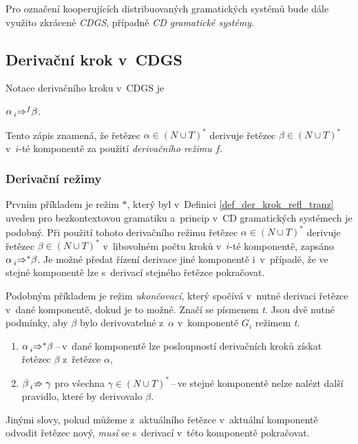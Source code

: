 \begin{convention}
    Pro označení kooperujících distribuovaných gramatických systémů bude dále využito zkrácené \emph{CDGS}, případně \emph{CD gramatické systémy}.
\end{convention}

\subsection*{Derivační krok v~CDGS}
Notace derivačního kroku v~CDGS je
\begin{center}
    $\alpha \prescript{}{i}{\Rightarrow}^{f} \beta$.
\end{center}
Tento zápis znamená, že řetězec $\alpha \in (N \cup T)^{*}$ derivuje řetězec $\beta \in (N \cup T)^{*}$ v~$i$-té komponentě za použití \emph{derivačního režimu} $f$.

\subsubsection*{Derivační režimy}

Prvním příkladem je režim $*$, který byl v~Definici \ref{def_der_krok_refl_tranz} uveden pro bezkontextovou gramatiku a~princip v~CD gramatických systémech je podobný.
Při použití tohoto derivačního režimu řetězec $\alpha \in (N \cup T)^*$ derivuje řetězec $\beta \in (N \cup T)^*$ v~libovolném počtu kroků v~$i$-té komponentě, zapsáno $\alpha \prescript{}{i}{\Rightarrow}^{*} \beta$.
Je možné předat řízení derivace jiné komponentě i~v~případě, že ve stejné komponentě lze s~derivací stejného řetězce pokračovat.

Podobným příkladem je režim \emph{ukončovací}, který spočívá v~nutné derivaci řetězce v~dané komponentě, dokud je to možné. Značí se písmenem \emph{t}. Jsou dvě nutné podmínky, aby $\beta$ bylo derivovatelné z~$\alpha$ v~komponentě $G_i$ režimem \emph{t}.
\begin{enumerate}
    \item $\alpha \prescript{}{i}{\Rightarrow}^{*} \beta$\,--\,v~dané komponentě lze posloupností derivačních kroků získat řetězec $\beta$ z~řetězce $\alpha$,
    \item $\beta \prescript{}{i}{\nRightarrow}\; \gamma$ pro všechna $\gamma \in (N \cup T)^{*}$\,--\,ve stejné komponentě nelze nalézt další pravidlo, které by derivovalo $\beta$.
\end{enumerate}
Jinými slovy, pokud můžeme z~aktuálního řetězce v~aktuální komponentě odvodit řetězec nový, \emph{musí} se s~derivací v~této komponentě pokračovat. 

